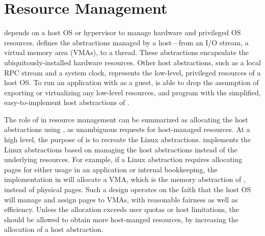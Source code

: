 \section{Resource Management}
\label{sec:libos:resource}


\Thelibos{}
depends on a host OS or hypervisor to manage hardware and privileged OS resources.
\Thehostabi{}
defines the abstractions managed by a host---from an I/O stream, a virtual memory area (VMAs), to a thread. %
These abstractions encapsulate the ubiquitously-installed hardware resources.
Other host abstractions, %
such as a local RPC stream and a system clock,
represents the low-level, privileged resources of a host OS.
To run an application with \thelibos{} as a guest,
\graphene{} is able to drop the assumption of exporting or virtualizing %
any low-level resources,
and program \thelibos{} with the simplified, easy-to-implement host abstractions of \thehostabi{}.




The role of \thelibos{} in resource management
can be summarized
as allocating the host abstractions using \thehostabi{},
as unambiguous requests %
for host-managed resources.
At a high level, the purpose of \thelibos{} is to recreate the Linux abstractions.
\Thelibos{} implements the Linux abstractions
based on managing the host abstractions instead of
the underlying resources.
For example, if a Linux abstraction requires allocating pages
for either usage in an application or
internal bookkeeping,
the implementation in
\thelibos{} will allocate a VMA, which is the memory abstraction of \thehostabi{}, instead of physical pages.
Such a \libos{} design operates on the faith that the host OS will manage and assign pages to VMAs, with reasonable fairness as well as efficiency.
Unless the allocation exceeds user quotas or host limitations,
the \libos{} should be allowed to obtain more host-manged resources,
by increasing the allocation of a host abstraction.




